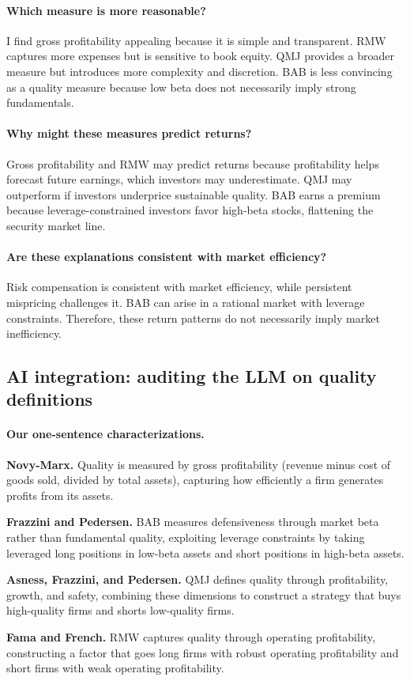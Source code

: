 \paragraph{Which measure is more reasonable?}
I find gross profitability appealing because it is simple and transparent. RMW captures more expenses but is sensitive to book equity. QMJ provides a broader measure but introduces more complexity and discretion. BAB is less convincing as a quality measure because low beta does not necessarily imply strong fundamentals.

\paragraph{Why might these measures predict returns?}
Gross profitability and RMW may predict returns because profitability helps forecast future earnings, which investors may underestimate. QMJ may outperform if investors underprice sustainable quality. BAB earns a premium because leverage-constrained investors favor high-beta stocks, flattening the security market line.

\paragraph{Are these explanations consistent with market efficiency?}
Risk compensation is consistent with market efficiency, while persistent mispricing challenges it. BAB can arise in a rational market with leverage constraints. Therefore, these return patterns do not necessarily imply market inefficiency.

\subsection*{AI integration: auditing the LLM on quality definitions}

\paragraph{Our one-sentence characterizations.}
\begin{tight}
  \item \textbf{Novy-Marx.} Quality is measured by gross profitability (revenue minus cost of goods sold, divided by total assets), capturing how efficiently a firm generates profits from its assets.
  \item \textbf{Frazzini and Pedersen.} BAB measures defensiveness through market beta rather than fundamental quality, exploiting leverage constraints by taking leveraged long positions in low-beta assets and short positions in high-beta assets.
  \item \textbf{Asness, Frazzini, and Pedersen.} QMJ defines quality through profitability, growth, and safety, combining these dimensions to construct a strategy that buys high-quality firms and shorts low-quality firms.
  \item \textbf{Fama and French.} RMW captures quality through operating profitability, constructing a factor that goes long firms with robust operating profitability and short firms with weak operating profitability.
\end{tight}

